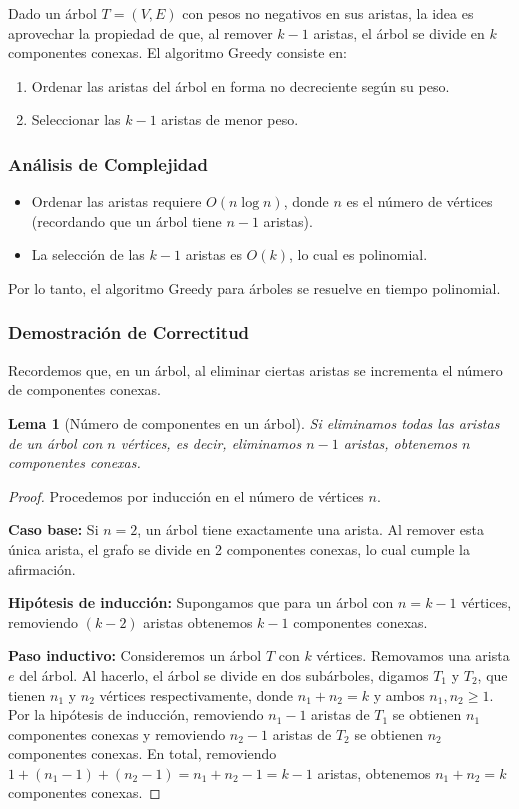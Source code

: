 \documentclass[a4paper, 12pt]{article}
\newtheorem{lemma}{Lema}[section]
\begin{document}
Dado un árbol \( T = (V,E) \) con pesos no negativos en sus aristas, la idea es aprovechar la propiedad de que, al remover \( k-1 \) aristas, el árbol se divide en \( k \) componentes conexas. El algoritmo Greedy consiste en:
\begin{enumerate}
    \item Ordenar las aristas del árbol en forma no decreciente según su peso.
    \item Seleccionar las \( k-1 \) aristas de menor peso.
\end{enumerate}
\subsubsection{Análisis de Complejidad}
\begin{itemize}
    \item Ordenar las aristas requiere \( O(n \log n) \), donde \( n \) es el número de vértices (recordando que un árbol tiene \( n-1 \) aristas).
    \item La selección de las \( k-1 \) aristas es \( O(k) \), lo cual es polinomial.
\end{itemize}
Por lo tanto, el algoritmo Greedy para árboles se resuelve en tiempo polinomial.

\subsubsection{Demostración de Correctitud}

Recordemos que, en un árbol, al eliminar ciertas aristas se incrementa el número de componentes conexas.

\begin{lemma}[Número de componentes en un árbol]
Si eliminamos todas las aristas de un árbol con \( n \) vértices, es decir, eliminamos \( n-1 \) aristas, obtenemos \( n \) componentes conexas.
\end{lemma}

\begin{proof}
Procedemos por inducción en el número de vértices \( n \).

\textbf{Caso base:}  
Si \( n = 2 \), un árbol tiene exactamente una arista. Al remover esta única arista, el grafo se divide en 2 componentes conexas, lo cual cumple la afirmación.

\textbf{Hipótesis de inducción:}  
Supongamos que para un árbol con \( n = k-1 \) vértices, removiendo \( (k-2) \) aristas obtenemos \( k-1 \) componentes conexas.

\textbf{Paso inductivo:}  
Consideremos un árbol \( T \) con \( k \) vértices. Removamos una arista \( e \) del árbol. Al hacerlo, el árbol se divide en dos subárboles, digamos \( T_1 \) y \( T_2 \), que tienen \( n_1 \) y \( n_2 \) vértices respectivamente, donde \( n_1 + n_2 = k \) y ambos \( n_1, n_2 \ge 1 \).  
Por la hipótesis de inducción, removiendo \( n_1 - 1 \) aristas de \( T_1 \) se obtienen \( n_1 \) componentes conexas y removiendo \( n_2 - 1 \) aristas de \( T_2 \) se obtienen \( n_2 \) componentes conexas.  
En total, removiendo \( 1 + (n_1 - 1) + (n_2 - 1) = n_1 + n_2 - 1 = k - 1 \) aristas, obtenemos \( n_1 + n_2 = k \) componentes conexas.  
\end{proof}
\end{document}
